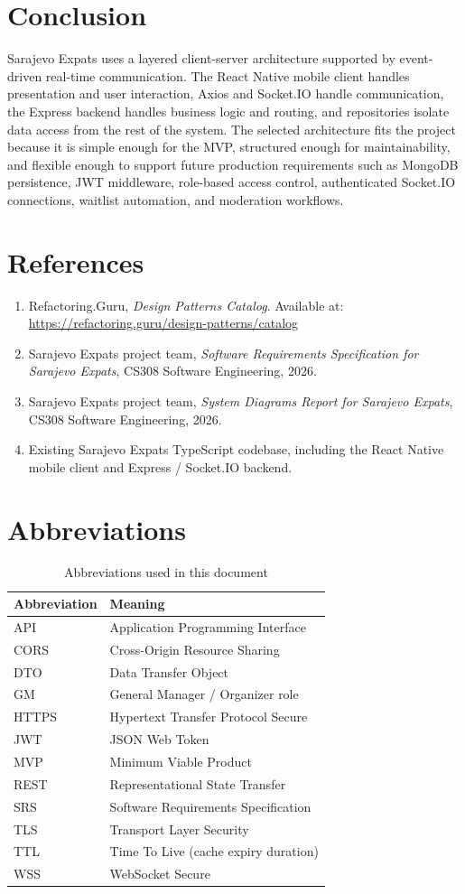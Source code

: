 \documentclass[12pt,a4paper]{article}
\begin{document}
\section{Conclusion}
Sarajevo Expats uses a layered client-server architecture supported by event-driven
real-time communication. The React Native mobile client handles presentation and user
interaction, Axios and Socket.IO handle communication, the Express backend handles
business logic and routing, and repositories isolate data access from the rest of the
system.
The selected architecture fits the project because it is simple enough for the MVP,
structured enough for maintainability, and flexible enough to support future production
requirements such as MongoDB persistence, JWT middleware, role-based access control,
authenticated Socket.IO connections, waitlist automation, and moderation workflows.
\section{References}
\begin{enumerate}
  \item Refactoring.Guru, \textit{Design Patterns Catalog}. Available at:
  \url{https://refactoring.guru/design-patterns/catalog}
  \item Sarajevo Expats project team, \textit{Software Requirements Specification for Sarajevo Expats}, CS308 Software Engineering, 2026.
  \item Sarajevo Expats project team, \textit{System Diagrams Report for Sarajevo Expats}, CS308 Software Engineering, 2026.
  \item Existing Sarajevo Expats TypeScript codebase, including the React Native mobile client and Express / Socket.IO backend.
\end{enumerate}
\appendix
\section{Abbreviations}
\begin{table}[H]
\centering
\caption{Abbreviations used in this document}
\begin{tabular}{@{}ll@{}}
\toprule
\textbf{Abbreviation} & \textbf{Meaning} \\
\midrule
API & Application Programming Interface \\
CORS & Cross-Origin Resource Sharing \\
DTO & Data Transfer Object \\
GM & General Manager / Organizer role \\
HTTPS & Hypertext Transfer Protocol Secure \\
JWT & JSON Web Token \\
MVP & Minimum Viable Product \\
REST & Representational State Transfer \\
SRS & Software Requirements Specification \\
TLS & Transport Layer Security \\
TTL & Time To Live (cache expiry duration) \\
WSS & WebSocket Secure \\
\bottomrule
\end{tabular}
\end{table}
\end{document}
